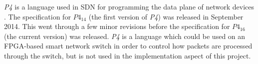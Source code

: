 

\textit{P4} is a language used in SDN for programming the data plane of network devices \cite{P4}. The specification for $P\mathit{4_{14}}$ (the first version of \textit{P4}) was released in September 2014. This went through a few minor revisions before the specification for $P\mathit{4_{16}}$ (the current version) was released. \textit{P4} is a language which could be used on an FPGA-based smart network switch in order to control how packets are processed through the switch, but is not used in the implementation aspect of this project.

